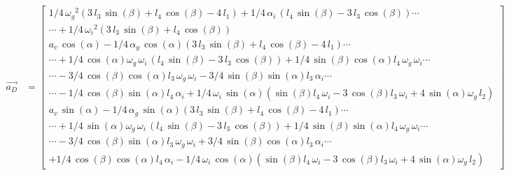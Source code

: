 \begin{equation*}
\begin{split}
\overrightarrow{a_{D}}
&=	\begin{bmatrix}
1/4\,{\omega_{g}}^{2} \left( 3\,l_{3}\,\sin\left( \beta \right) +l_{4}\,\cos \left( \beta \right) -4\,l_{1}\right) +1/4\,\alpha_{i}\, \left( l_{4}\,\sin \left( \beta \right) -3\,l_{3}\,\cos \left( \beta \right)  \right)\cdots\\
\cdots +1/4\,{\omega_{i}}^{2}\left( 3\,l_{3}\,\sin \left( \beta \right) +l_{4}\,\cos \left( \beta\right)  \right) \\
%
a_{v}\,\cos \left( \alpha\right) -1/4\,\alpha_{g}\,\cos \left( \alpha \right)  \left( 3\,l_{3}\,\sin \left( \beta \right) +l_{4}\,\cos \left( \beta \right) -4\,l_{1} \right)\cdots\\
\cdots +1/4\,\cos \left( \alpha \right) \omega_{g}\,\omega_{i}\,\left( l_{4}\,\sin \left( \beta \right) -3\,l_{3}\,\cos \left( \beta\right)  \right) +1/4\,\sin \left( \beta \right) \cos \left( \alpha\right) l_{4}\,\omega_{g}\,\omega_{i}\cdots\\
\cdots-3/4\,\cos \left( \beta \right) \cos \left( \alpha \right) l_{3}\,\omega_{g}\,\omega_{i}-3/4\,\sin\left( \beta \right) \sin \left( \alpha \right) l_{3}\,\alpha_{i}\cdots\\
\cdots-1/4\,\cos \left( \beta \right) \sin \left( \alpha \right) l_{4}\,\alpha_{i}+1/4\,\omega_{i}\,\sin \left( \alpha \right)  \left( \sin \left( \beta \right) l_{4}\,\omega_{i}-3\,\cos \left( \beta \right) l_{3}\,\omega_{i}+4\,\sin \left( \alpha \right) \omega_{g}\,l_{2} \right) \\
%
a_{v}\,\sin \left( \alpha \right) -1/4\,\alpha_{g}\,\sin \left( \alpha \right)  \left( 3\,l_{3}\,\sin \left( \beta \right) +l_{4}\,\cos \left( \beta \right) -4\,l_{1} \right)\cdots\\
\cdots +1/4\,\sin \left( \alpha \right) \omega_{g}\,\omega_{i}\, \left( l_{4}\,\sin \left( \beta \right) -3\,l_{3}\,\cos \left( \beta \right) \right) +1/4\,\sin \left( \beta \right) \sin \left( \alpha \right) l_{4}\,\omega_{g}\,\omega_{i}\cdots\\
\cdots-3/4\,\cos \left( \beta \right) \sin\left( \alpha \right) l_{3}\,\omega_{g}\,\omega_{i}+3/4\,\sin \left( \beta \right) \cos \left( \alpha \right) l_{3}\,\alpha_{i}\cdots\\
+1/4\,\cos\left( \beta \right) \cos \left( \alpha \right) l_{4}\,\alpha_{i}-1/4\,\omega_{i}\,\cos \left( \alpha \right)  \left( \sin \left( \beta\right) l_{4}\,\omega_{i}-3\,\cos \left( \beta \right) l_{3}\,\omega_{i}+4\,\sin \left( \alpha \right) \omega_{g}\,l_{2} \right) \
\end{bmatrix}
\end{split}
\end{equation*}